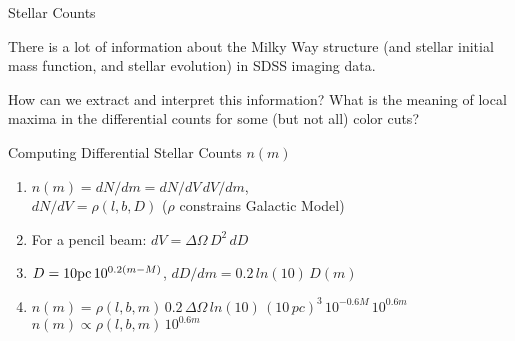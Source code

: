 \documentclass[letterpaper,landscape]{slides}
\begin{document}
\begin{slide}
\begin{center}
{\large \color{red} 
                    Stellar Counts
}
\end{center}


There is a lot of information about the Milky Way structure (and stellar
initial mass function, and stellar evolution) in SDSS imaging data.

{\color{blue} 
How can we extract and interpret this information? What is the meaning
of local maxima in the differential counts for some (but not all) color
cuts? 
}
 
    \begin{center}
        \begin{minipage}{7in}
            \phantom{x}  \hskip -1.5in 
           {}
         \end{minipage}
     \end{center}
 
    
\vfill
\end{slide}







\begin{slide}
\begin{center}
{\large \color{red}  Computing Differential Stellar Counts $n(m)$  }
\end{center}

\begin{enumerate}

\item
     $n(m) = dN/dm = dN/dV \, dV/dm$, \\ $dN/dV = \rho(l,b,D)$ ($\rho$ constrains Galactic Model)

\item
For a pencil beam: $dV = \Delta \Omega \, D^2 \, dD$

\item
      $D = 10 {\rm pc} \, 10^{0.2(m-M)}$, $dD/dm = 0.2\,ln(10)\, D(m)$

\item
 $n(m) = \rho(l,b,m)\, 0.2\, \Delta \Omega\,ln(10)\,(10\,pc)^3\,10^{-0.6M}\,10^{0.6m}$ \\

{\color{blue} \Large \hskip 1.5in   $n(m) \propto \rho(l,b,m)\, 10^{0.6m}$}

\end{enumerate}  

\vfill
\end{slide}
\end{document}
